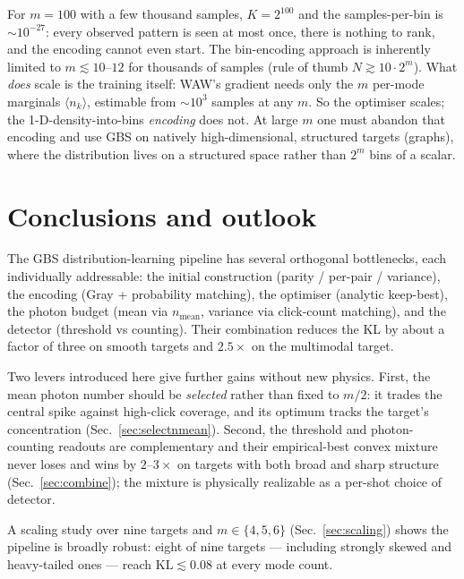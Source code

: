 \documentclass[11pt,a4paper]{article}
\begin{document}
For $m=100$ with a few thousand samples, $K=2^{100}$ and the samples-per-bin is
$\sim10^{-27}$: every observed pattern is seen at most once, there is nothing to
rank, and the encoding cannot even start. The bin-encoding approach is inherently
limited to $m\lesssim10$--$12$ for thousands of samples (rule of thumb
$N\gtrsim10\cdot2^m$). What \emph{does} scale is the training itself: WAW's
gradient needs only the $m$ per-mode marginals $\langle n_k\rangle$, estimable
from $\sim\!10^3$ samples at any $m$. So the optimiser scales; the
1-D-density-into-bins \emph{encoding} does not. At large $m$ one must abandon that
encoding and use GBS on natively high-dimensional, structured targets (graphs),
where the distribution lives on a structured space rather than $2^m$ bins of a
scalar.

\section{Conclusions and outlook}
\label{sec:outlook}
The GBS distribution-learning pipeline has several orthogonal bottlenecks, each
individually addressable: the initial construction (parity / per-pair /
variance), the encoding (Gray + probability matching), the optimiser (analytic
keep-best), the photon budget (mean via $n_{\mathrm{mean}}$, variance via
click-count matching), and the detector (threshold vs counting). Their
combination reduces the KL by about a factor of three on smooth targets and
$2.5\times$ on the multimodal target.

Two levers introduced here give further gains without new physics. First, the
mean photon number should be \emph{selected} rather than fixed to $m/2$: it
trades the central spike against high-click coverage, and its optimum tracks the
target's concentration (Sec.~\ref{sec:selectnmean}). Second, the threshold and
photon-counting readouts are complementary and their empirical-best convex
mixture never loses and wins by $2$--$3\times$ on targets with both broad and
sharp structure (Sec.~\ref{sec:combine}); the mixture is physically realizable
as a per-shot choice of detector.

A scaling study over nine targets and $m\in\{4,5,6\}$ (Sec.~\ref{sec:scaling})
shows the pipeline is broadly robust: eight of nine targets --- including
strongly skewed and heavy-tailed ones --- reach $\mathrm{KL}\lesssim0.08$ at
every mode count.
\end{document}
